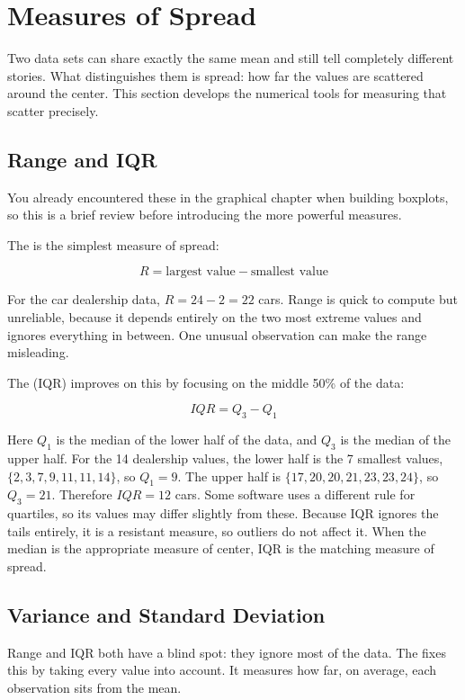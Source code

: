 \section{Measures of Spread}

Two data sets can share exactly the same mean and still tell completely
different stories. What distinguishes them is spread: how far the
values are scattered around the center. This section develops the
numerical tools for measuring that scatter precisely.

\subsection{Range and IQR}

You already encountered these in the graphical chapter when building
boxplots, so this is a brief review before introducing the more
powerful measures.

The  is the simplest measure of spread:

\[
R = \text{largest value} - \text{smallest value}
\]

For the car dealership data, $R = 24 - 2 = 22$ cars. Range is quick to
compute but unreliable, because it depends entirely on the two most extreme
values and ignores everything in between. One unusual observation can
make the range misleading.

The  (IQR)
improves on this by focusing on the middle 50\% of the data:

\[
IQR = Q_3 - Q_1
\]

Here $Q_1$ is the median of the lower half of the data, and $Q_3$ is the median of the upper half. For the 14 dealership values, the lower half is the 7 smallest values, $\{2, 3, 7, 9, 11, 11, 14\}$, so $Q_1 = 9$. The upper half is $\{17, 20, 20, 21, 23, 23, 24\}$, so $Q_3 = 21$. Therefore $IQR = 12$ cars. Some software uses a different rule for quartiles, so its values may differ slightly from these.
Because IQR ignores the tails entirely, it is a resistant measure, so outliers do not affect it. When the median is the appropriate measure
of center, IQR is the matching measure of spread.

\subsection{Variance and Standard Deviation}

Range and IQR both have a blind spot: they ignore most of the data.
The  fixes this
by taking every value into account. It measures how far, on average,
each observation sits from the mean.

